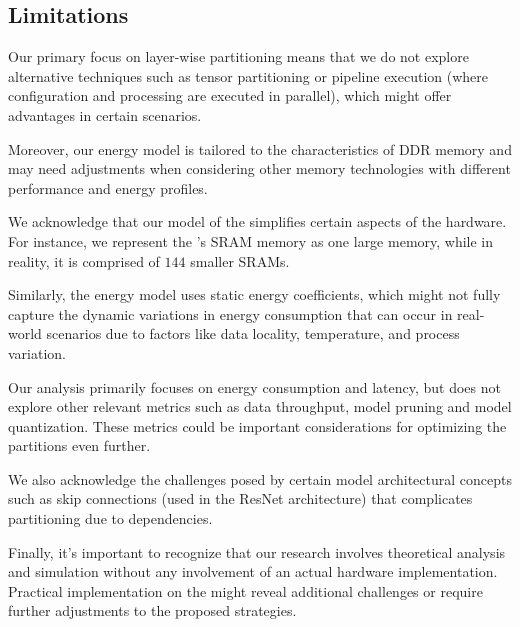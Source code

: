 \subsection{Limitations}
Our primary focus on layer-wise partitioning means that we do not explore alternative techniques such as tensor partitioning or pipeline execution (where configuration and processing are executed in parallel), which might offer advantages in certain scenarios.

Moreover, our energy model is tailored to the characteristics of DDR memory and may need adjustments when considering other memory technologies with different performance and energy profiles.

We acknowledge that our model of the \graicore{} simplifies certain aspects of the hardware.
For instance, we represent the \graicore{}'s SRAM memory as one large memory, while in reality, it is comprised of $144$ smaller SRAMs.

Similarly, the energy model uses static energy coefficients, which might not fully capture the dynamic variations in energy consumption that can occur in real-world scenarios due to factors like data locality, temperature, and process variation.

Our analysis primarily focuses on energy consumption and latency, but does not explore other relevant metrics such as data throughput, model pruning and model quantization.
These metrics could be important considerations for optimizing the partitions even further.

We also acknowledge the challenges posed by certain model architectural concepts such as skip connections (used in the ResNet architecture) that complicates partitioning due to dependencies.

Finally, it's important to recognize that our research involves theoretical analysis and simulation without any involvement of an actual hardware implementation.
Practical implementation on the \graicore{} might reveal additional challenges or require further adjustments to the proposed strategies.
